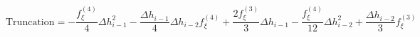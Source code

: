 \begin{equation} 
\text{Truncation} = - \frac{f^{{(4)}}_{{\xi}}}{4} \Delta h_{{i-1}}^{2} - \frac{\Delta h_{{i-1}}}{4} \Delta h_{{i-2}} f^{{(4)}}_{{\xi}} + \frac{2 f^{{(3)}}_{{\xi}}}{3} \Delta h_{{i-1}} - \frac{f^{{(4)}}_{{\xi}}}{12} \Delta h_{{i-2}}^{2} + \frac{\Delta h_{{i-2}}}{3} f^{{(3)}}_{{\xi}}
 \end{equation}